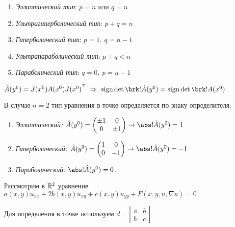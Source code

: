 \documentclass[../main.tex]{subfiles}
\begin{document}
\begin{enumerate}
  \item \textit{Эллиптический тип}: $p = n$ или $q = n$
  \item \textit{Ультрагиперболический тип}: $p+q = n$
  \item \textit{Гиперболический тип}: $p = 1,\ q = n-1$
  \item \textit{Ультрапараболический тип}: $p + q < n$
  \item \textit{Параболический тип}: $q = 0,\ p = n-1$
\end{enumerate}

\begin{remark}
$\hat{A}(y^0) = J(x^0)A(x^0)J(x^0)^\Transp 
\ \Rightarrow\ 
\sign\det\brk!{ \hat{A}(y^0) } = \sign\det\brk!{ A(x^0) }$ 
\end{remark}

В случае $n = 2$ тип уравнения в точке определяется по знаку определителя:
\begin{enumerate}

  \item \textit{Эллиптический: } $\hat{A}(y^0) = \begin{pmatrix}
    \pm1 & 0 \\ 0 & \pm1
    \end{pmatrix} \rightarrow \abs!{\hat{A}(y^0)} = 1$

  \item \textit{Гиперболический:} $\hat{A}(y^0) = \begin{pmatrix}
    1 & 0 \\ 0 & -1
    \end{pmatrix} \rightarrow \abs!{\hat{A}(y^0)} = -1$

  \item \textit{Параболический:}\; $\abs!{\hat{A}(y^0)} = 0$.
  
\end{enumerate}



Рассмотрим в $\mathbb{R}^2$ уравнение 
$a(x,y)u_{xx} + 2b(x,y)u_{xy} + c(x,y)u_{yy} + F(x,y,u,\nabla u) = 0$

Для определения в точке используем $d = 
\left|
  \begin{array}{cc}
    a & b \\
    b & c  
  \end{array} 
\right| $
\end{document}
